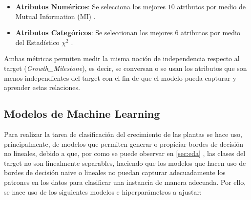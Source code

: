 \documentclass[12pt,a4paper]{article}
\begin{document}
{{            \begin{itemize}
                \item \textbf{Atributos Numéricos}: Se selecciona los mejores $10$ atributos por 
                medio de Mutual Information (MI) \cite{sklearn_mutual_info}.
                \item \textbf{Atributos Categóricos}: Se seleccionan los mejores $6$ atributos por 
                medio del Estadístico $\chi^2$ \cite{sklearn_chi2}.
            \end{itemize}

            Ambas métricas permiten medir la misma noción de independencia respecto al target 
            (\emph{Growth\_Milestone}), es decir, se conversan o se usan los atributos que 
            son menos independientes del target con el fin de que el modelo pueda capturar 
            y aprender estas relaciones.\\
        }
        
        \subsection{Modelos de Machine Learning}
        {
            Para realizar la tarea de clasificación del crecimiento de las plantas se hace uso, 
            principalmente, de modelos que permiten generar o propiciar bordes de decisión no 
            lineales, debido a que, por como se puede observar en \ref{sec:eda} , 
            las clases del target no son linealmente separables, haciendo que los modelos que hacen 
            uso de bordes de decisión naive o lineales no puedan capturar adecuadamente los patrones 
            en los datos para clasificar una instancia de manera adecuada. Por ello, se hace uso de 
            los siguientes modelos e hiperparámetros a ajustar:\\

}}
\end{document}
